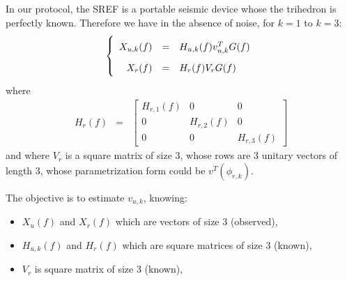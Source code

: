 \documentclass[a4paper, 12pt]{report}
\begin{document}
In our protocol, the  SREF is a portable seismic device whose the trihedron  is perfectly known. 
Therefore we have in the absence of noise, for $k=1$ to $k=3$:
\begin{eqnarray}
\label{eq:signalmodel}
\left\{
\renewcommand\arraystretch{1.8}
\begin{array}{rcl}
X_{u,k}(f)&=&H_{u,k}(f)v_{u,k}^{T}G(f)
\\
X_{r}(f)&=&H_{r}(f)V_{r}G(f)
\end{array}
\right.
\end{eqnarray}
where
\begin{eqnarray*}
H_{r}(f)&=&\begin{bmatrix}
H_{r,1}(f)&0&0
\\
0&H_{r,2}(f)&0
\\
0&0&H_{r,3}(f)
\end{bmatrix}
\end{eqnarray*}
and where $V_{r}$ is a square matrix of size 3, whose rows are 3 unitary vectors of length $3$, whose parametrization form could be $v^{T}(\phi_{r,k})$.


The objective is to estimate $v_{u,k}$, knowing:
\begin{itemize}
\item
$X_{u}(f)$ and $X_{r}(f)$ which are vectors of size 3 (observed),
\item
$H_{u,k}(f)$ and $H_{r}(f)$ which are square matrices of size 3 (known),
\item
$V_{r}$ is square matrix of size 3 (known),
\end{itemize}
\end{document}
